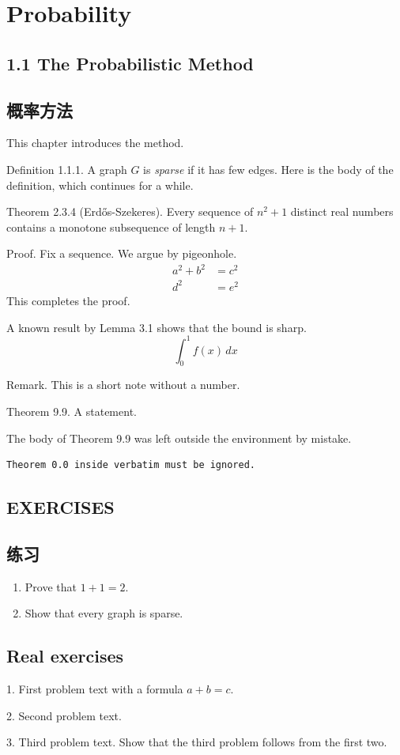 \documentclass[11pt]{book}
\begin{document}
\chapter{Probability}

\section*{1.1 The Probabilistic Method}
\begin{tcolorbox}
\section*{概率方法}
\end{tcolorbox}

This chapter introduces the method.

Definition 1.1.1. A graph $G$ is \emph{sparse} if it has few edges.
Here is the body of the definition, which continues for a while.

Theorem 2.3.4 (Erd\H{o}s-Szekeres). Every sequence of $n^2+1$ distinct real numbers
contains a monotone subsequence of length $n+1$.

Proof. Fix a sequence. We argue by pigeonhole.
\begin{align}
a^2 + b^2 &= c^2 \\
d^2 &= e^2
\end{align}
This completes the proof.

A known result by Lemma 3.1 shows that the bound is sharp.
\[
  \int_0^1 f(x)\,dx
\]

Remark. This is a short note without a number.

\begin{theorem}
Theorem 9.9. A statement.
\end{theorem}
The body of Theorem 9.9 was left outside the environment by mistake.

\begin{verbatim}
Theorem 0.0 inside verbatim must be ignored.
\end{verbatim}

\section*{EXERCISES}
\begin{tcolorbox}
\section*{练习}
\end{tcolorbox}
\begin{enumerate}
\item[1.] Prove that $1+1=2$.
\item[2.] Show that every graph is sparse.
\end{enumerate}

\section*{Real exercises}

1. First problem text with a formula $a+b=c$.

2. Second problem text.

3. Third problem text.
Show that the third problem follows from the first two.
\end{document}
